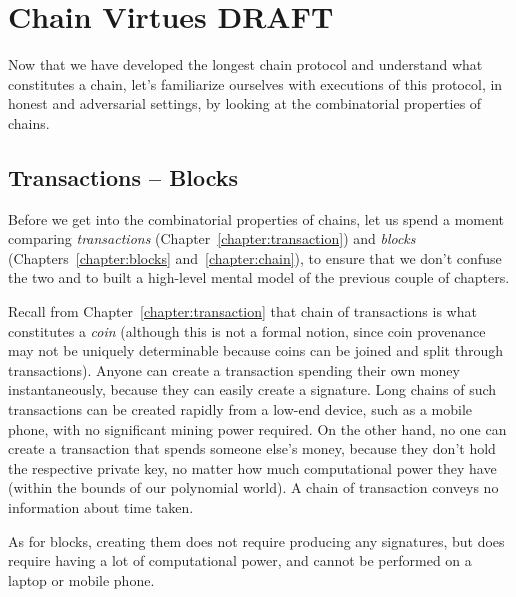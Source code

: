\chapter{Chain Virtues \small{\textsf{DRAFT}}}\label{chapter:virtues}

Now that we have developed the longest chain protocol and understand
what constitutes a chain, let's familiarize ourselves with executions
of this protocol, in honest and adversarial settings, by looking at
the combinatorial properties of chains.

\section{Transactions -- Blocks}

Before we get into the combinatorial properties of chains, let us spend a moment
comparing \emph{transactions} (Chapter~\ref{chapter:transaction}) and \emph{blocks}
(Chapters~\ref{chapter:blocks} and~\ref{chapter:chain}), to ensure
that we don't confuse the two and to built a high-level mental model of the
previous couple of chapters.

Recall from Chapter~\ref{chapter:transaction} that chain of transactions is what constitutes
a \emph{coin} (although this is not a formal notion, since coin provenance may not be uniquely
determinable because coins can be joined and split through transactions).
Anyone can create a transaction spending their own money instantaneously, because
they can easily create a signature. Long chains of such transactions can be created rapidly
from a low-end device, such as a mobile phone, with no significant mining power required.
On the other hand, no one can create a transaction that spends someone else's money,
because they don't hold the respective private key, no matter how much computational
power they have (within the bounds of our polynomial world). A chain of transaction
conveys no information about time taken.

As for blocks, creating them does not require producing any signatures, but does require
having a lot of computational power, and cannot be performed on a laptop or mobile phone.


